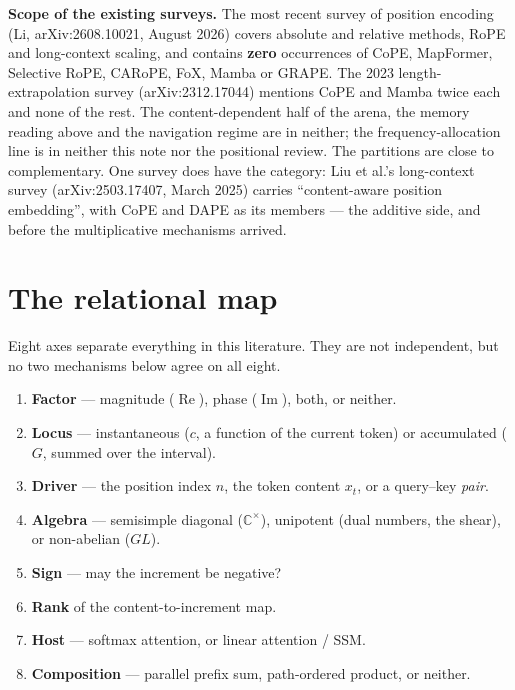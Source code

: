 \documentclass[11pt]{article}
\newcommand{\C}{\mathbb{C}}
\begin{document}
\noindent\textbf{Scope of the existing surveys.} The most recent survey of position
encoding (Li, arXiv:2608.10021, August 2026) covers absolute and relative methods, RoPE
and long-context scaling, and contains \textbf{zero} occurrences of CoPE, MapFormer,
Selective RoPE, CARoPE, FoX, Mamba or GRAPE. The 2023 length-extrapolation survey
(arXiv:2312.17044) mentions CoPE and Mamba twice each and none of the rest. The
content-dependent half of the arena, the memory reading above and the navigation regime
are in neither; the frequency-allocation line is in neither this note nor the
positional review. The partitions are close to complementary. One survey does have
the category: Liu et al.'s long-context survey (arXiv:2503.17407, March 2025)
carries ``content-aware position embedding'', with CoPE and DAPE as its members ---
the additive side, and before the multiplicative mechanisms arrived.

\section{The relational map}
\label{sec:map}

Eight axes separate everything in this literature. They are not independent, but
no two mechanisms below agree on all eight.

\begin{enumerate}\itemsep1pt
\item[\textbf{A1}] \textbf{Factor} --- magnitude ($\operatorname{Re}$), phase
  ($\operatorname{Im}$), both, or neither.
\item[\textbf{A2}] \textbf{Locus} --- instantaneous ($c$, a function of the
  current token) or accumulated ($G$, summed over the interval).
\item[\textbf{A3}] \textbf{Driver} --- the position index $n$, the token content
  $x_t$, or a query--key \emph{pair}.
\item[\textbf{A4}] \textbf{Algebra} --- semisimple diagonal ($\C^\times$),
  unipotent (dual numbers, the shear), or non-abelian ($GL$).
\item[\textbf{A5}] \textbf{Sign} --- may the increment be negative?
\item[\textbf{A6}] \textbf{Rank} of the content-to-increment map.
\item[\textbf{A7}] \textbf{Host} --- softmax attention, or linear attention / SSM.
\item[\textbf{A8}] \textbf{Composition} --- parallel prefix sum, path-ordered
  product, or neither.
\end{enumerate}
\end{document}
